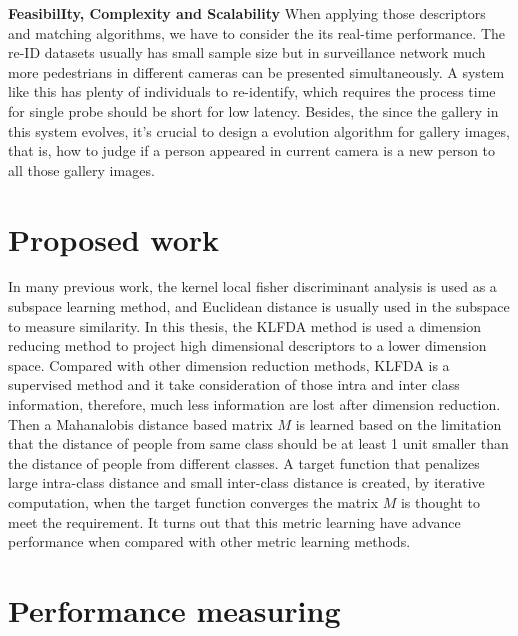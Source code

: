 \textbf{FeasibilIty, Complexity and Scalability} When applying those descriptors and matching algorithms, we have to consider the its real-time performance.   The re-ID datasets usually has small sample size but in surveillance network much more pedestrians in different cameras can be presented simultaneously. A system like this has plenty of individuals to re-identify, which requires the process time for single probe should be short for low latency. Besides, the since the gallery in this system evolves, it's crucial to design a evolution algorithm for gallery images, that is, how to judge if a person appeared in current camera is a new person to all those gallery images.

\section{Proposed work}
In many previous work, the kernel local fisher discriminant analysis is used as a subspace learning method, and Euclidean distance is usually used in the subspace to measure similarity. In this thesis, the KLFDA method is used a dimension reducing method to project high dimensional descriptors to a lower dimension space. Compared with other dimension reduction methods, KLFDA is a supervised method and it take consideration of those intra and inter class information, therefore, much less information are lost after dimension reduction. Then a Mahanalobis distance based matrix $M$ is learned based on the limitation that the distance of people from same class should be at least 1 unit smaller than the distance of people from different classes. A target function that penalizes large intra-class distance and small inter-class distance is created, by iterative computation, when the target function converges the matrix $M$ is thought to meet the requirement. It turns out that this metric learning have advance performance when compared with other metric learning methods.



\section{Performance measuring}

